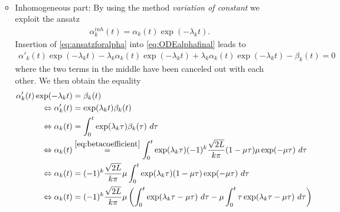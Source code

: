 \documentclass[12pt]{article}
\begin{document}
\begin{enumerate}
\begin{itemize}
\begin{align}
		            \end{align}
		      \item Inhomogeneous part: By using the method \emph{variation of constant}
		            we exploit the ansatz 
		            \begin{align}
			            \label{eq:ansatzforalpha}
			            \alpha^{inh}_{k}(t) = \alpha_{k}(t)\exp(-\lambda_k t).
		            \end{align}
		            Insertion of \eqref{eq:ansatzforalpha} into \eqref{eq:ODEalphafinal} leads to 
		            \begin{align*}
			            \alpha'_{k}(t)\exp(-\lambda_k t)
			            - \lambda_k \alpha_{k}(t)\exp(-\lambda_k t)
			            + \lambda_k \alpha_{k}(t)\exp(-\lambda_k t)
			            - \beta_{k}(t)                   = 0                  
		            \end{align*}
		            where the two terms in the middle have been canceled out with each other. 
		            We then obtain the equality
		            \begin{align}
			            \alpha'_{k}(t)\exp(-\lambda_k t)
			             & = \beta_{k}(t) \notag                                                                              \\
			            \Leftrightarrow \alpha'_{k}(t)   
			             & = \exp(\lambda_k t)\beta_{k}(t)                                                      \notag        \\
			            \Leftrightarrow \alpha_{k}(t)
			             & = \int_{0}^{t} \exp(\lambda_k \tau)\beta_{k}(\tau)\ d\tau                            \notag        \\
			            \Leftrightarrow \alpha_{k}(t)
			             & \stackrel{\eqref{eq:betacoefficient}}{=}
			            \int_0^t \exp(\lambda_k \tau)
			            (-1)^k \frac{\sqrt{2 L}}{k \pi} (1- \mu\tau) \mu \exp(-\mu\tau) \ d\tau                       \notag  \\
			            \Leftrightarrow \alpha_{k}(t)
			             & = (-1)^k \frac{\sqrt{2L}}{k \pi} \mu \int_0^t 
			            \exp(\lambda_{k}\tau) ( 1 - \mu\tau) \exp(-\mu\tau) \ d\tau                                    \notag \\
			            \Leftrightarrow \alpha_{k}(t)
			             & = (-1)^k \frac{\sqrt{2L}}{k \pi} \mu 
			            \left(
			            \int_0^t \exp(\lambda_k \tau - \mu\tau)  \ d\tau
			            - \mu \int_0^t \tau \exp(\lambda_k \tau -\mu\tau ) \ d\tau 
			            \right)                                                                                 \notag        \\

\end{align}
\end{itemize}
\end{enumerate}
\end{document}
